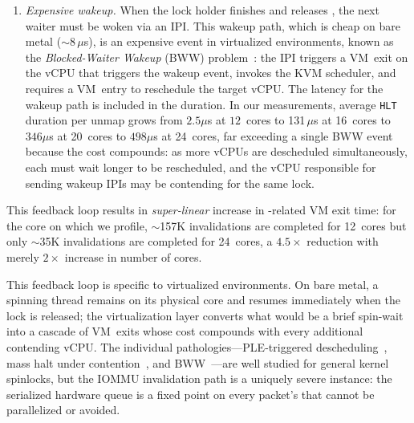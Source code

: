 \begin{enumerate}
\item \textit{Expensive wakeup.}
  When the lock holder finishes and
  releases , the next waiter must be
  woken via an IPI.
This wakeup path, which is cheap on bare metal (${\sim}$8\,$\mu$s),
  is an expensive event in virtualized environments,
  known as the \emph{Blocked-Waiter Wakeup} (BWW) problem~\cite{Ding2014gleaner}:
  the IPI triggers a VM~exit on the vCPU that triggers the wakeup event, invokes the KVM scheduler,
  and requires a VM~entry to reschedule the target vCPU. The latency for the wakeup path is included in the  duration.
In our measurements, average \texttt{HLT} duration per unmap
  grows from $2.5\mu$s at $12$~cores to 131\,$\mu$s at 16~cores to $346\mu$s at 20~cores to $498\mu$s at 24~cores, far exceeding a single BWW event because the cost compounds:
  as more vCPUs are descheduled simultaneously, 
  each must wait longer to be rescheduled,
  and the vCPU responsible for sending wakeup IPIs
  may be contending for the same lock.
\end{enumerate}
This feedback loop results in {\it super-linear} increase in -related VM exit time:
  for the core on which we profile, ${\sim}$157K invalidations are completed for 12~cores
  but only ${\sim}$35K invalidations are completed for 24~cores, a $4.5\times$ reduction with merely $2\times$ increase in number of cores. %

This feedback loop is specific to virtualized environments.
On bare metal, a spinning thread remains on its physical
  core and resumes immediately when the lock is released;
  the virtualization layer converts what would be a brief
  spin-wait into a cascade of VM~exits whose cost compounds
  with every additional contending vCPU.
The individual pathologies---PLE-triggered 
  descheduling~\cite{Shan2017apples}, 
  mass halt under contention~\cite{Kashyap2016oppspinlocks}, 
  and BWW~\cite{Ding2014gleaner, Kashyap2018ecs}---are well studied
  for general kernel spinlocks,
  but the IOMMU invalidation path is a uniquely severe instance:
  the serialized hardware queue is a fixed point
  on every packet's  that cannot be
  parallelized or avoided.

